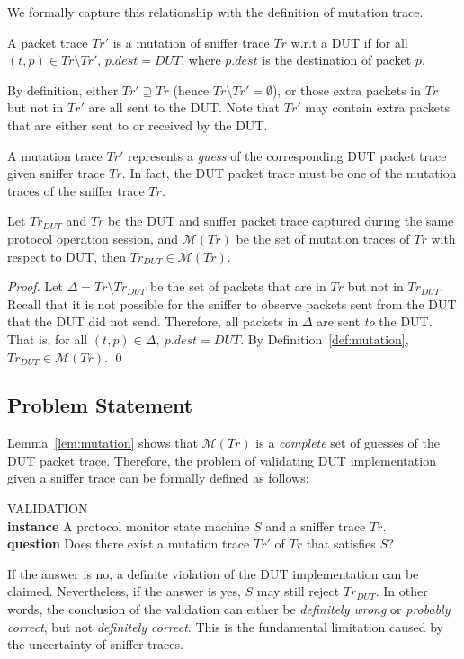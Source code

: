 We formally capture this relationship with the definition of mutation trace.

\begin{definition}
  \label{def:mutation}
  A packet trace $Tr'$ is a mutation of sniffer trace $Tr$ w.r.t a DUT if for
  all $(t, p) \in Tr \setminus Tr'$, $p.dest = DUT$, where $p.dest$ is the
  destination of packet $p$.
\end{definition}

By definition, either $Tr' \supseteq Tr$ (hence $Tr \setminus Tr' = \emptyset$),
or those extra packets in $Tr$ but not in $Tr'$ are all sent to the DUT. Note
that $Tr'$ may contain extra packets that are either sent to or received by
the DUT.

A mutation trace $Tr'$ represents a \textit{guess} of the corresponding DUT
packet trace given sniffer trace $Tr$.  In fact, the DUT packet trace must
be one of the mutation traces of the sniffer trace $Tr$.

\begin{lemma}
  Let $Tr_{DUT}$ and $Tr$ be the DUT and sniffer packet trace captured during
  the same protocol operation session, and $\mathcal{M}(Tr)$ be the set of
  mutation traces of $Tr$ with respect to DUT, then $Tr_{DUT} \in \mathcal{M}(Tr)$.
  \label{lem:mutation}
\end{lemma}%
\begin{proof}
  Let $\Delta = Tr \setminus Tr_{DUT}$ be the set of packets that are in $Tr$
  but not in $Tr_{DUT}$. Recall that it is not possible for the sniffer to
  observe packets sent from the DUT that the DUT did not send. Therefore,
  all packets in $\Delta$ are sent \textit{to} the DUT. That is, for
  all $(t, p) \in \Delta,\ p.dest = DUT$. By Definition~\ref{def:mutation},
  $Tr_{DUT} \in \mathcal{M}(Tr)$.
  \qed
\end{proof}


\subsection{Problem Statement}
\label{subsec:problem}

Lemma~\ref{lem:mutation} shows that $\mathcal{M}(Tr)$ is a \textit{complete} set
of guesses of the DUT packet trace. Therefore, the problem of validating DUT
implementation given a sniffer trace can be formally defined as follows:

\begin{problem}
  \label{prob:validation}
  VALIDATION\\
  \textbf{instance} A protocol monitor state machine $S$ and a sniffer trace $Tr$.\\
  \textbf{question} Does there exist a mutation trace $Tr'$ of $Tr$ that satisfies $S$?
\end{problem}

If the answer is no, a definite violation of the DUT implementation can be
claimed. Nevertheless, if the answer is yes, $S$ may still reject $Tr_{DUT}$.
In other words, the conclusion of the validation can either be
\textit{definitely wrong} or \textit{probably correct}, but not
\textit{definitely correct}.  This is the fundamental limitation caused by the
uncertainty of sniffer traces.
